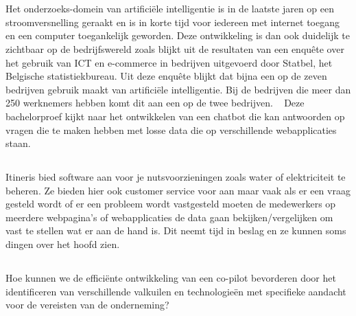 
\chapter{}%
\label{ch:inleiding}

Het onderzoeks-domein van artificiële intelligentie is in de laatste jaren op een stroomversnelling geraakt en is in korte tijd voor iedereen met internet toegang en een computer toegankelijk geworden. Deze ontwikkeling is dan ook duidelijk te zichtbaar op de bedrijfswereld zoals blijkt uit de resultaten van een  enquête over het gebruik van ICT en e-commerce in bedrijven uitgevoerd door Statbel, het Belgische statistiekbureau. Uit deze enquête blijkt dat bijna een op de zeven bedrijven gebruik maakt van artificiële intelligentie. Bij de bedrijven die meer dan 250 werknemers hebben komt dit aan een op de twee bedrijven. ~\autocite{STATBEL2023}
Deze bachelorproef kijkt naar het ontwikkelen van een chatbot die kan antwoorden op vragen die te maken hebben met losse data die op verschillende webapplicaties staan. 


\section{}%
\label{sec:probleemstelling}

Itineris bied software aan voor je nutsvoorzieningen zoals water of elektriciteit te beheren. Ze bieden hier ook customer service voor aan maar vaak als er een vraag gesteld wordt of er een probleem wordt vastgesteld moeten de medewerkers op meerdere webpagina's of webapplicaties de data gaan bekijken/vergelijken om vast te stellen wat er aan de hand is. Dit neemt tijd in beslag en ze kunnen soms dingen over het hoofd zien. 

\section{}%
\label{sec:onderzoeksvraag}

Hoe kunnen we de efficiënte ontwikkeling van een co-pilot bevorderen door het identificeren van verschillende valkuilen en technologieën met specifieke aandacht voor de vereisten van de onderneming? 

